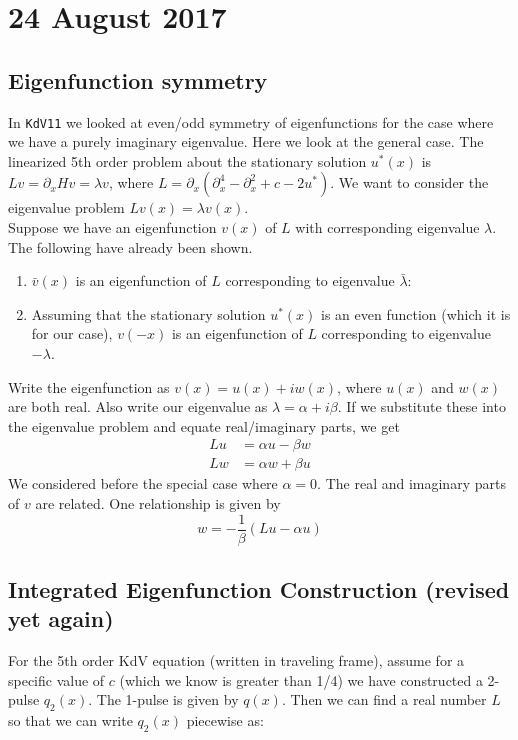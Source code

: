\documentclass[12pt]{article}
\begin{document}
\section*{24 August 2017}

\subsection*{Eigenfunction symmetry}

In \texttt{KdV11} we looked at even/odd symmetry of eigenfunctions for the case where we have a purely imaginary eigenvalue. Here we look at the general case. The linearized 5th order problem about the stationary solution $u^*(x)$ is $Lv = \partial_x Hv = \lambda v$, where $L = \partial_x( \partial_x^4 - \partial_x^2 + c - 2u^*)$. We want to consider the eigenvalue problem $Lv(x) = \lambda v(x)$. \\

Suppose we have an eigenfunction $v(x)$ of $L$ with corresponding eigenvalue $\lambda$. The following have already been shown.
\begin{enumerate}
	\item $\bar{v}(x)$ is an eigenfunction of $L$ corresponding to eigenvalue $\bar{\lambda}$:
	\item Assuming that the stationary solution $u^*(x)$ is an even function (which it is for our case), $v(-x)$ is an eigenfunction of $L$ corresponding to eigenvalue $-\lambda$.
\end{enumerate}
Write the eigenfunction as $v(x) = u(x) + i w(x)$, where $u(x)$ and $w(x)$ are both real. Also write our eigenvalue as $\lambda = \alpha + i \beta$. If we substitute these into the eigenvalue problem and equate real/imaginary parts, we get
\begin{align*}
Lu &= \alpha u - \beta w \\
Lw &= \alpha w + \beta u
\end{align*}
We considered before the special case where $\alpha = 0$. The real and imaginary parts of $v$ are related. One relationship is given by
\[
w = -\frac{1}{\beta}(Lu - \alpha u)
\]

\subsection*{Integrated Eigenfunction Construction (revised yet again)}
For the 5th order KdV equation (written in traveling frame), assume for a specific value of $c$ (which we know is greater than 1/4) we have constructed a 2-pulse $q_2(x)$. The 1-pulse is given by $q(x)$. Then we can find a real number $L$ so that we can write $q_2(x)$ piecewise as:
\end{document}
